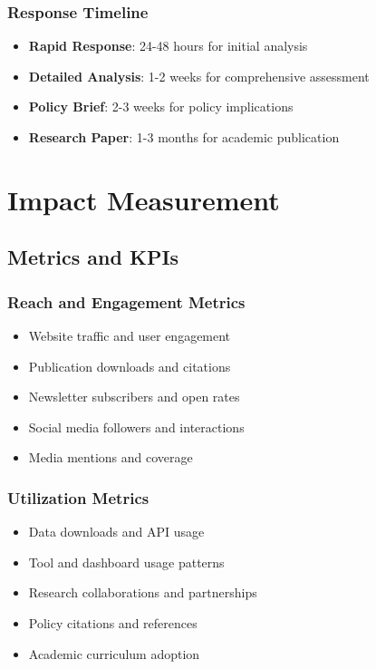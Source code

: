 \documentclass[11pt,a4paper]{article}
\begin{document}
\subsubsection{Response Timeline}
\begin{itemize}
    \item \textbf{Rapid Response}: 24-48 hours for initial analysis
    \item \textbf{Detailed Analysis}: 1-2 weeks for comprehensive assessment
    \item \textbf{Policy Brief}: 2-3 weeks for policy implications
    \item \textbf{Research Paper}: 1-3 months for academic publication
\end{itemize}

\section{Impact Measurement}

\subsection{Metrics and KPIs}

\subsubsection{Reach and Engagement Metrics}
\begin{itemize}
    \item Website traffic and user engagement
    \item Publication downloads and citations
    \item Newsletter subscribers and open rates
    \item Social media followers and interactions
    \item Media mentions and coverage
\end{itemize}

\subsubsection{Utilization Metrics}
\begin{itemize}
    \item Data downloads and API usage
    \item Tool and dashboard usage patterns
    \item Research collaborations and partnerships
    \item Policy citations and references
    \item Academic curriculum adoption
\end{itemize}
\end{document}
